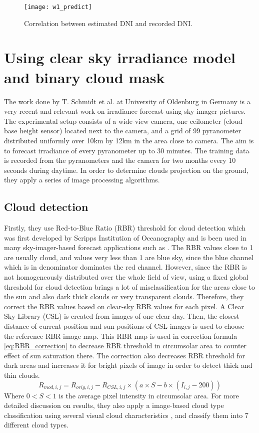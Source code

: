 \begin{figure}[h]
\caption{Correlation between estimated DNI and recorded DNI.}
\label{fig:w1_predict}
\texttt{[image: w1\_predict]}
\centering
\end{figure} 

\section{Using clear sky irradiance model and binary cloud mask}
The work done by T. Schmidt et al.\cite{tSchmidt_full} at University of Oldenburg in Germany is a very recent and relevant work on irradiance forecast using sky imager pictures. The experimental setup consists of a wide-view camera, one ceilometer (cloud base height sensor) located next to the camera, and a grid of 99 pyranometer distributed uniformly over 10km by 12km in the area close to camera. The aim is to forecast irradiance of every pyranometer up to 30 minutes. The training data is recorded from the pyranometers and the camera for two months every 10 seconds during daytime.
In order to determine clouds projection on the ground, they apply a series of image processing algorithms. 
\subsection{Cloud detection}
Firstly, they use Red-to-Blue Ratio (RBR) threshold for cloud detection which was first developed by Scripps Institution of Oceanography \cite{RBR89, RBR98} and is been used in many sky-imager-based forecast applications such as \cite{cloud_detection_using_RBR}.  The RBR values close to 1 are usually cloud, and values very less than 1 are blue sky, since the blue channel which is in denominator dominates the red channel. However, since the RBR is not homogeneously distributed over the whole field of view, using a fixed global threshold for cloud detection brings a lot of misclassification for the areas close to the sun and also dark thick clouds or very transparent clouds. Therefore, they correct the RBR values based on clear-sky RBR values for each pixel. A Clear Sky Library (CSL) is created from images of one clear day. Then, the closest distance of current position and sun positions of CSL images is used to choose the reference RBR image map. This RBR map is used in correction formula \ref{eq:RBR_correction} to decrease RBR threshold in circumsolar area to counter effect of sun saturation there. The correction also decreases RBR threshold for dark areas and increases it for bright pixels of image in order to detect thick and thin clouds.
\begin{equation}
\label{eq:RBR_correction}
R_{mod,i,j} =  R_{orig,i,j} - R_{CSL,i,j} \times (a \times S - b \times (I_{i,j} - 200))
\end{equation}
Where $0<S<1$ is the average pixel intensity in circumsolar area. For more detailed discussion on results, they also apply a image-based cloud type classification using several visual cloud characteristics , and classify them into 7 different cloud types.

